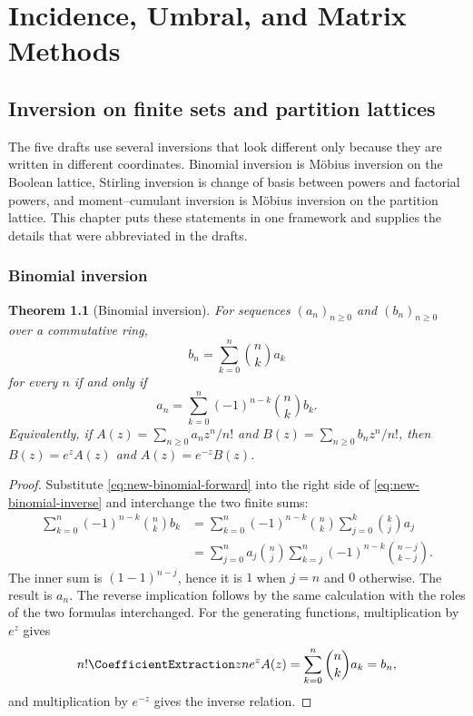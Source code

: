 \documentclass[11pt,a4paper,oneside,openany]{book}
\newtheorem{theorem}{Theorem}[chapter]
\theoremstyle{definition}
\theoremstyle{remark}
\begin{document}
\part{Incidence, Umbral, and Matrix Methods}
\label{part:incidence-umbral}

\chapter{Inversion on finite sets and partition lattices}
\label{ch:incidence-inversion}

The five drafts use several inversions that look different only because they are
written in different coordinates.  Binomial inversion is Möbius inversion on the
Boolean lattice, Stirling inversion is change of basis between powers and factorial
powers, and moment--cumulant inversion is Möbius inversion on the partition lattice.
This chapter puts these statements in one framework and supplies the details that
were abbreviated in the drafts.

\section{Binomial inversion}

\begin{theorem}[Binomial inversion]\label{thm:new-binomial-inversion}
For sequences $(a_n)_{n\ge0}$ and $(b_n)_{n\ge0}$ over a commutative ring,
\begin{equation}\label{eq:new-binomial-forward}
 b_n=\sum_{k=0}^n\binom nk a_k
\end{equation}
for every $n$ if and only if
\begin{equation}\label{eq:new-binomial-inverse}
 a_n=\sum_{k=0}^n(-1)^{n-k}\binom nk b_k.
\end{equation}
Equivalently, if $A(z)=\sum_{n\ge0}a_nz^n/n!$ and
$B(z)=\sum_{n\ge0}b_nz^n/n!$, then $B(z)=e^zA(z)$ and
$A(z)=e^{-z}B(z)$.
\end{theorem}

\begin{proof}
Substitute \eqref{eq:new-binomial-forward} into the right side of
\eqref{eq:new-binomial-inverse} and interchange the two finite sums:
\begin{align*}
 \sum_{k=0}^n(-1)^{n-k}\binom nk b_k
 &=\sum_{k=0}^n(-1)^{n-k}\binom nk
   \sum_{j=0}^k\binom kj a_j\\
 &=\sum_{j=0}^na_j\binom nj
   \sum_{k=j}^n(-1)^{n-k}\binom{n-j}{k-j}.
\end{align*}
The inner sum is $(1-1)^{n-j}$, hence it is $1$ when $j=n$ and $0$
otherwise.  The result is $a_n$.  The reverse implication follows by the same
calculation with the roles of the two formulas interchanged.  For the generating
functions, multiplication by $e^z$ gives
\[
 n!\CoefficientExtraction z n e^zA(z)=\sum_{k=0}^n\binom nk a_k=b_n,
\]
and multiplication by $e^{-z}$ gives the inverse relation.
\end{proof}
\end{document}
